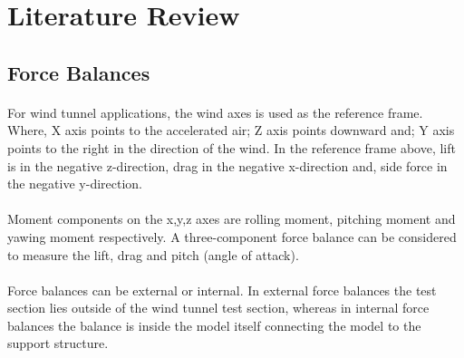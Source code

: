 \section{Literature Review}
\subsection{Force Balances}
\paragraph{}For wind tunnel applications, the wind axes is used as the reference frame. Where, X axis points to the accelerated air; Z axis points downward and; Y axis points to the right in the direction of the wind. In the reference frame above, lift is in the negative z-direction, drag in the negative x-direction and, side force in the negative y-direction.
\paragraph{}Moment components on the x,y,z axes are rolling moment, pitching moment and yawing moment respectively. A three-component force balance can be considered to measure the lift, drag and pitch (angle of attack).
\paragraph{}Force balances can be external or internal. In external force balances the test section lies outside of the wind tunnel test section, whereas in internal force balances the balance is inside the model itself connecting the model to the support structure.
